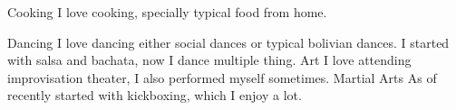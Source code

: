 



\begin{cvskills}
  \cvskill
    {Cooking}%
    {I love cooking, specially typical food from home.}%

  \cvskill
    {Dancing}%
    {I love dancing either social dances or typical bolivian dances. I
    started with salsa and bachata, now I dance multiple thing.}
  \cvskill
    {Art}%
    {I love attending improvisation theater, I also performed myself
    sometimes.}%
  \cvskill
    {Martial Arts}%
    {As of recently started with kickboxing, which I enjoy a lot.}%

\end{cvskills}